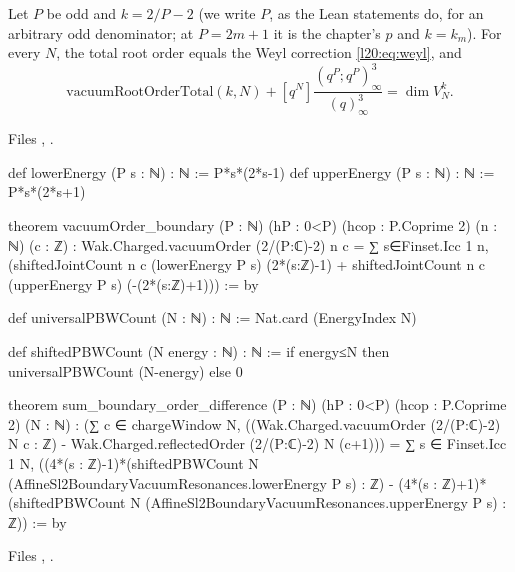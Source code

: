 \begin{theorem}\label{l20:thm:resonances}
Let $P$ be odd and $k=2/P-2$ (we write $P$, as the Lean statements do, for an arbitrary odd denominator; at
$P=2m+1$ it is the chapter's $p$ and $k=k_m$). For every $N$, the total root order equals the Weyl correction \eqref{l20:eq:weyl}, and
\begin{equation*}
\mathrm{vacuumRootOrderTotal}(k,N)+[q^N]\frac{(q^P;q^P)^3_\infty}{(q)^3_\infty}=\dim V^k_N.
\end{equation*}
\end{theorem}
\noindent Files ,
.
\begin{leancode}
def lowerEnergy (P s : ℕ) : ℕ := P*s*(2*s-1)
def upperEnergy (P s : ℕ) : ℕ := P*s*(2*s+1)

theorem vacuumOrder_boundary (P : ℕ) (hP : 0<P) (hcop : P.Coprime 2)
    (n : ℕ) (c : ℤ) :
    Wak.Charged.vacuumOrder (2/(P:ℂ)-2) n c =
      ∑ s∈Finset.Icc 1 n, (shiftedJointCount n c (lowerEnergy P s) (2*(s:ℤ)-1) +
        shiftedJointCount n c (upperEnergy P s) (-(2*(s:ℤ)+1))) := by

def universalPBWCount (N : ℕ) : ℕ := Nat.card (EnergyIndex N)

def shiftedPBWCount (N energy : ℕ) : ℕ :=
  if energy≤N then universalPBWCount (N-energy) else 0

theorem sum_boundary_order_difference (P : ℕ) (hP : 0<P) (hcop : P.Coprime 2) (N : ℕ) :
    (∑ c ∈ chargeWindow N,
      ((Wak.Charged.vacuumOrder (2/(P:ℂ)-2) N c : ℤ) -
        Wak.Charged.reflectedOrder (2/(P:ℂ)-2) N (c+1))) =
      ∑ s ∈ Finset.Icc 1 N,
        ((4*(s : ℤ)-1)*(shiftedPBWCount N
          (AffineSl2BoundaryVacuumResonances.lowerEnergy P s) : ℤ) -
         (4*(s : ℤ)+1)*(shiftedPBWCount N
          (AffineSl2BoundaryVacuumResonances.upperEnergy P s) : ℤ)) := by
\end{leancode}
\noindent Files ,
.
